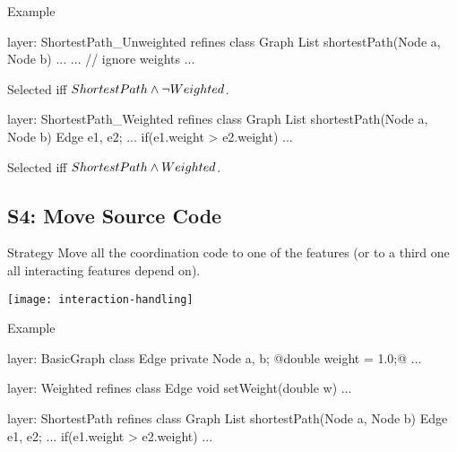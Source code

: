 \begin{frame}[fragile]{Example}
	\begin{mycolumns}[widths={50,50},animation=none]
\begin{codetight}{layer: ShortestPath\_Unweighted}
refines class Graph {
	List shortestPath(Node a, Node b){
		...
		...
		// ignore weights
		... 
	}
}
\end{codetight}
		\begin{note}{}		
			Selected iff $ShortestPath \wedge \neg Weighted$. 
		\end{note}
	\mynextcolumn
\begin{codetight}{layer: ShortestPath\_Weighted}
refines class Graph {
	List shortestPath(Node a, Node b){
		Edge e1, e2;
		...
		if(e1.weight > e2.weight) 
		... 
	}
}
\end{codetight}	
		\begin{note}{}
			Selected iff $ShortestPath \wedge Weighted$.
		\end{note}
	\end{mycolumns}
\end{frame}

\subsection{S4: Move Source Code}

\begin{frame}{\myframetitle}
	\begin{definition}{Strategy}
		Move all the coordination code to one of the features (or to a third one all interacting features depend on).
	\end{definition}
	\begin{notetight}{}
		\centering\texttt{[image: interaction-handling]}
	\end{notetight}
\end{frame}

\begin{frame}[fragile]{Example}
	\begin{mycolumns}[widths={50,50},animation=none]
\begin{codetight}{layer: BasicGraph}
class Edge {
	private Node a, b;
	@double weight = 1.0;@
	...
}
\end{codetight}	
\begin{codetight}{layer: Weighted}
refines class Edge {
	void setWeight(double w){ ... }
}
\end{codetight}	
	\mynextcolumn
\begin{codetight}{layer: ShortestPath}
refines class Graph {
	List shortestPath(Node a, Node b){
		Edge e1, e2;
		...
		if(e1.weight > e2.weight) 
		... 
	}
}
\end{codetight}	
	\end{mycolumns}
\end{frame}

